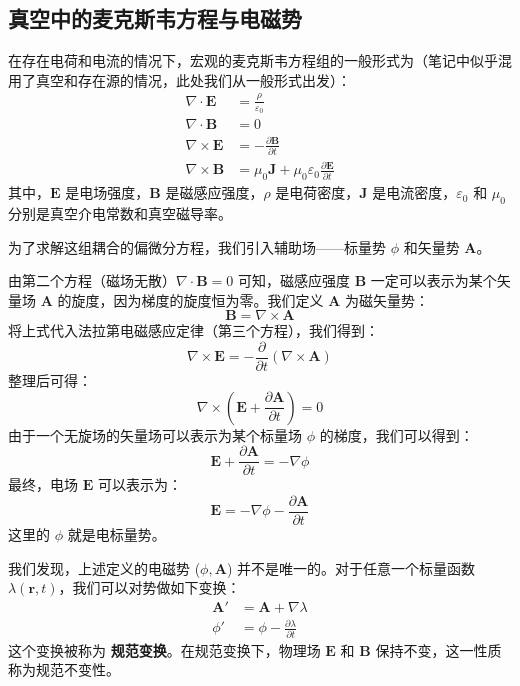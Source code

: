 \documentclass[fontset=none]{ctexart}
\begin{document}
\subsection{真空中的麦克斯韦方程与电磁势}
在存在电荷和电流的情况下，宏观的麦克斯韦方程组的一般形式为（笔记中似乎混用了真空和存在源的情况，此处我们从一般形式出发）：
\begin{equation}
    \begin{aligned}
        \nabla \cdot \bm{E} &= \frac{\rho}{\varepsilon_0} \\
        \nabla \cdot \bm{B} &= 0 \\
        \nabla \times \bm{E} &= -\frac{\partial \bm{B}}{\partial t} \\
        \nabla \times \bm{B} &= \mu_0 \bm{J} + \mu_0 \varepsilon_0 \frac{\partial \bm{E}}{\partial t}
    \end{aligned}
\end{equation}
其中，$\bm{E}$ 是电场强度，$\bm{B}$ 是磁感应强度，$\rho$ 是电荷密度，$\bm{J}$ 是电流密度，$\varepsilon_0$ 和 $\mu_0$ 分别是真空介电常数和真空磁导率。

为了求解这组耦合的偏微分方程，我们引入辅助场——标量势 $\phi$ 和矢量势 $\bm{A}$。

由第二个方程（磁场无散）$\nabla \cdot \bm{B} = 0$ 可知，磁感应强度 $\bm{B}$ 一定可以表示为某个矢量场 $\bm{A}$ 的旋度，因为梯度的旋度恒为零。我们定义 $\bm{A}$ 为磁矢量势：
\begin{equation}
    \bm{B} = \nabla \times \bm{A}
\end{equation}
将上式代入法拉第电磁感应定律（第三个方程），我们得到：
\begin{equation}
    \nabla \times \bm{E} = -\frac{\partial}{\partial t}(\nabla \times \bm{A})
\end{equation}
整理后可得：
\begin{equation}
    \nabla \times \left( \bm{E} + \frac{\partial \bm{A}}{\partial t} \right) = 0
\end{equation}
由于一个无旋场的矢量场可以表示为某个标量场 $\phi$ 的梯度，我们可以得到：
\begin{equation}
    \bm{E} + \frac{\partial \bm{A}}{\partial t} = -\nabla \phi
\end{equation}
最终，电场 $\bm{E}$ 可以表示为：
\begin{equation}
    \bm{E} = -\nabla \phi - \frac{\partial \bm{A}}{\partial t}
\end{equation}
这里的 $\phi$ 就是电标量势。

\begin{definition}[规范变换]
    我们发现，上述定义的电磁势 ($\phi, \bm{A}$) 并不是唯一的。对于任意一个标量函数 $\lambda(\bm{r}, t)$，我们可以对势做如下变换：
    \begin{equation}
        \begin{aligned}
            \bm{A}' &= \bm{A} + \nabla \lambda \\
            \phi' &= \phi - \frac{\partial \lambda}{\partial t}
        \end{aligned}
    \end{equation}
    这个变换被称为 \textbf{规范变换}。在规范变换下，物理场 $\bm{E}$ 和 $\bm{B}$ 保持不变，这一性质称为规范不变性。
\end{definition}
\end{document}
